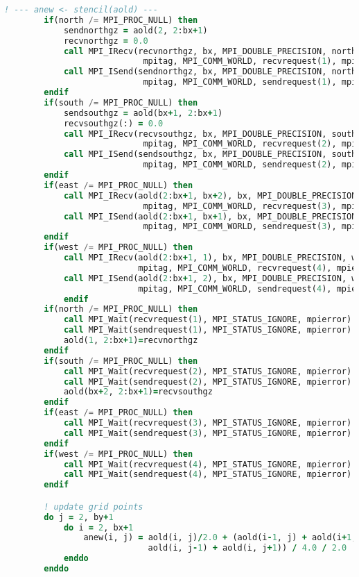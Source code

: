 \begin{lstlisting}[language=Fortran, caption={Parallel F90 implementation of the stencil test case.}]
        ! --- anew <- stencil(aold) ---
        if(north /= MPI_PROC_NULL) then 
            sendnorthgz = aold(2, 2:bx+1)
            recvnorthgz = 0.0
            call MPI_IRecv(recvnorthgz, bx, MPI_DOUBLE_PRECISION, north,  &
                            mpitag, MPI_COMM_WORLD, recvrequest(1), mpierror)
            call MPI_ISend(sendnorthgz, bx, MPI_DOUBLE_PRECISION, north,  &
                            mpitag, MPI_COMM_WORLD, sendrequest(1), mpierror)
        endif   
        if(south /= MPI_PROC_NULL) then 
            sendsouthgz = aold(bx+1, 2:bx+1)
            recvsouthgz(:) = 0.0
            call MPI_IRecv(recvsouthgz, bx, MPI_DOUBLE_PRECISION, south,  &
                            mpitag, MPI_COMM_WORLD, recvrequest(2), mpierror)
            call MPI_ISend(sendsouthgz, bx, MPI_DOUBLE_PRECISION, south,  &
                            mpitag, MPI_COMM_WORLD, sendrequest(2), mpierror)
        endif    
        if(east /= MPI_PROC_NULL) then 
            call MPI_IRecv(aold(2:bx+1, bx+2), bx, MPI_DOUBLE_PRECISION, east, &
                            mpitag, MPI_COMM_WORLD, recvrequest(3), mpierror)
            call MPI_ISend(aold(2:bx+1, bx+1), bx, MPI_DOUBLE_PRECISION, east, &
                            mpitag, MPI_COMM_WORLD, sendrequest(3), mpierror)
        endif    
        if(west /= MPI_PROC_NULL) then 
            call MPI_IRecv(aold(2:bx+1, 1), bx, MPI_DOUBLE_PRECISION, west, &
                           mpitag, MPI_COMM_WORLD, recvrequest(4), mpierror)
            call MPI_ISend(aold(2:bx+1, 2), bx, MPI_DOUBLE_PRECISION, west, &
                           mpitag, MPI_COMM_WORLD, sendrequest(4), mpierror)
            endif
        if(north /= MPI_PROC_NULL) then 
            call MPI_Wait(recvrequest(1), MPI_STATUS_IGNORE, mpierror)
            call MPI_Wait(sendrequest(1), MPI_STATUS_IGNORE, mpierror)
            aold(1, 2:bx+1)=recvnorthgz
        endif
        if(south /= MPI_PROC_NULL) then 
            call MPI_Wait(recvrequest(2), MPI_STATUS_IGNORE, mpierror)
            call MPI_Wait(sendrequest(2), MPI_STATUS_IGNORE, mpierror)
            aold(bx+2, 2:bx+1)=recvsouthgz
        endif
        if(east /= MPI_PROC_NULL) then 
            call MPI_Wait(recvrequest(3), MPI_STATUS_IGNORE, mpierror)
            call MPI_Wait(sendrequest(3), MPI_STATUS_IGNORE, mpierror)
        endif
        if(west /= MPI_PROC_NULL) then 
            call MPI_Wait(recvrequest(4), MPI_STATUS_IGNORE, mpierror)
            call MPI_Wait(sendrequest(4), MPI_STATUS_IGNORE, mpierror)
        endif  

        ! update grid points
        do j = 2, by+1 
            do i = 2, bx+1
                anew(i, j) = aold(i, j)/2.0 + (aold(i-1, j) + aold(i+1, j) +  &
                             aold(i, j-1) + aold(i, j+1)) / 4.0 / 2.0
            enddo
        enddo


\end{lstlisting}
